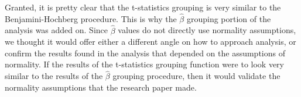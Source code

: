\par Granted, it is pretty clear that the t-statistics grouping is very similar
to the Benjamini-Hochberg procedure. This is why the $\hat{\beta}$ grouping 
portion of the analysis was added on. Since $\hat{\beta}$ values do not 
directly use normality assumptions, we thought it would offer either a 
different angle on how to approach analysis, or confirm the results found in 
the analysis that depended on the assumptions of normality. If the results of
the t-statistics grouping function were to look very similar to the results of
the $\hat{\beta}$ grouping procedure, then it would validate the normality 
assumptions that the research paper made. 